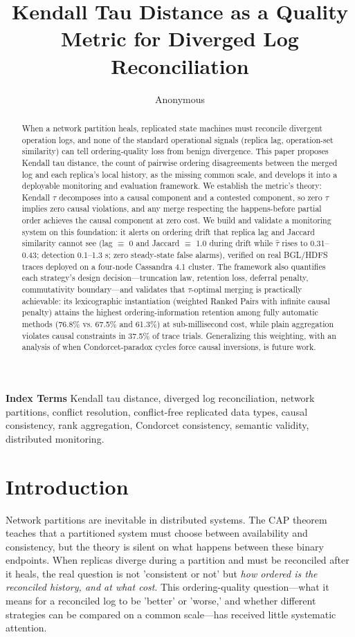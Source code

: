 \documentclass[11pt]{article}
\begin{document}
\title{Kendall Tau Distance as a Quality Metric for Diverged Log Reconciliation}
\author{Anonymous}
\date{}
\maketitle

\begin{abstract}
When a network partition heals, replicated state machines must reconcile divergent operation logs, and none of the standard operational signals (replica lag, operation-set similarity) can tell ordering-quality loss from benign divergence. This paper proposes Kendall tau distance, the count of pairwise ordering disagreements between the merged log and each replica's local history, as the missing common scale, and develops it into a deployable monitoring and evaluation framework. We establish the metric's theory: Kendall $\tau $ decomposes into a causal component and a contested component, so zero $\tau $ implies zero causal violations, and any merge respecting the happens-before partial order achieves the causal component at zero cost. We build and validate a monitoring system on this foundation: it alerts on ordering drift that replica lag and Jaccard similarity cannot see (lag $\equiv $ 0 and Jaccard $\equiv $ 1.0 during drift while $\hat{\tau}$ rises to 0.31–0.43; detection 0.1–1.3 s; zero steady-state false alarms), verified on real BGL/HDFS traces deployed on a four-node Cassandra 4.1 cluster. The framework also quantifies each strategy's design decision—truncation law, retention loss, deferral penalty, commutativity boundary—and validates that $\tau $-optimal merging is practically achievable: its lexicographic instantiation (weighted Ranked Pairs with infinite causal penalty) attains the highest ordering-information retention among fully automatic methods (76.8\% vs. 67.5\% and 61.3\%) at sub-millisecond cost, while plain aggregation violates causal constraints in 37.5\% of trace trials. Generalizing this weighting, with an analysis of when Condorcet-paradox cycles force causal inversions, is future work.
\end{abstract}

\noindent\textbf{Index Terms\textemdash} Kendall tau distance, diverged log reconciliation, network partitions, conflict resolution, conflict-free replicated data types, causal consistency, rank aggregation, Condorcet consistency, semantic validity, distributed monitoring.

\section{Introduction}
Network partitions are inevitable in distributed systems. The CAP theorem teaches that a partitioned system must choose between availability and consistency, but the theory is silent on what happens between these binary endpoints. When replicas diverge during a partition and must be reconciled after it heals, the real question is not 'consistent or not' but \emph{how ordered is the reconciled history, and at what cost}. This ordering-quality question—what it means for a reconciled log to be 'better' or 'worse,' and whether different strategies can be compared on a common scale—has received little systematic attention.
\end{document}
